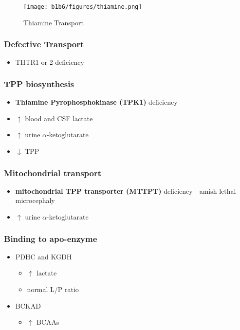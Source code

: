 \documentclass{scrartcl}
\begin{document}
\begin{figure}[htbp]
\centering
\texttt{[image: b1b6/figures/thiamine.png]}
\caption{\label{fig:org47155f3}Thiamine Transport}
\end{figure}

\subsubsection{Defective Transport}
\label{sec:org032980f}
\begin{itemize}
\item THTR1 or 2 deficiency
\end{itemize}
\subsubsection{TPP biosynthesis}
\label{sec:org6bcc936}
\begin{itemize}
\item \textbf{Thiamine Pyrophosphokinase (TPK1)} deficiency
\item \(\uparrow\) blood and CSF lactate
\item \(\uparrow\) urine \(\alpha\)-ketoglutarate
\item \(\downarrow\) TPP
\end{itemize}
\subsubsection{Mitochondrial transport}
\label{sec:orgc4399f2}
\begin{itemize}
\item \textbf{mitochondrial TPP transporter (MTTPT)} deficiency - amish lethal
microcephaly
\item \(\uparrow\) urine \(\alpha\)-ketoglutarate
\end{itemize}
\subsubsection{Binding to apo-enzyme}
\label{sec:org126a975}
\begin{itemize}
\item PDHC and KGDH
\begin{itemize}
\item \(\uparrow\) lactate
\item normal L/P ratio
\end{itemize}
\item BCKAD
\begin{itemize}
\item \(\uparrow\) BCAAs
\end{itemize}
\end{itemize}
\end{document}
